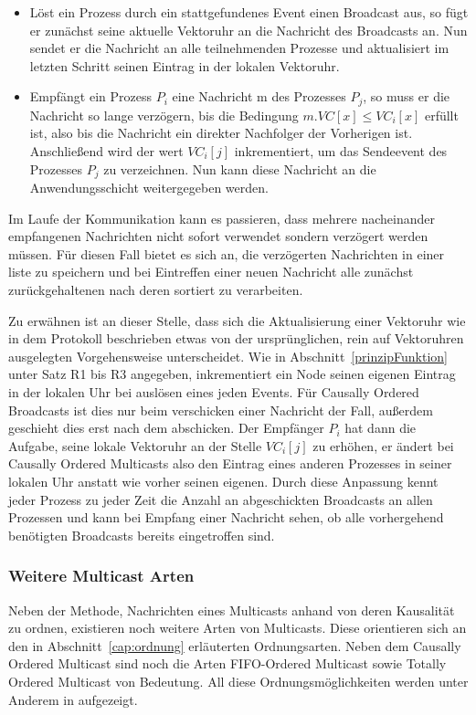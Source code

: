 \begin{itemize}
	\item Löst ein Prozess durch ein stattgefundenes Event einen Broadcast aus, so fügt er zunächst seine aktuelle Vektoruhr an die Nachricht des Broadcasts an. Nun sendet er die Nachricht an alle teilnehmenden Prozesse und aktualisiert im letzten Schritt seinen Eintrag in der lokalen Vektoruhr.
	\item Empfängt ein Prozess $P_i$ eine Nachricht m des Prozesses $P_j$, so muss er die Nachricht so lange verzögern, bis die Bedingung $m.VC[x] \le VC_i[x]$ erfüllt ist, also bis die Nachricht ein direkter Nachfolger der Vorherigen ist. Anschließend wird der wert $VC_i[j]$ inkrementiert, um das Sendeevent des Prozesses $P_j$ zu verzeichnen. Nun kann diese Nachricht an die Anwendungsschicht weitergegeben werden.
\end{itemize}

Im Laufe der Kommunikation kann es passieren, dass mehrere nacheinander empfangenen Nachrichten nicht sofort verwendet sondern verzögert werden müssen. Für diesen Fall bietet es sich an, die verzögerten Nachrichten in einer liste zu speichern und bei Eintreffen einer neuen Nachricht alle zunächst zurückgehaltenen nach deren  sortiert zu verarbeiten.

Zu erwähnen ist an dieser Stelle, dass sich die Aktualisierung einer Vektoruhr wie in dem Protokoll beschrieben etwas von der ursprünglichen, rein auf Vektoruhren ausgelegten Vorgehensweise unterscheidet. Wie in Abschnitt~\ref{prinzipFunktion} unter Satz R1 bis R3 angegeben, inkrementiert ein Node seinen eigenen Eintrag in der lokalen Uhr bei auslösen eines jeden Events. Für Causally Ordered Broadcasts ist dies nur beim verschicken einer Nachricht der Fall, außerdem geschieht dies erst nach dem abschicken. Der Empfänger $P_i$ hat dann die Aufgabe, seine lokale Vektoruhr an der Stelle $VC_i[j]$ zu erhöhen, er ändert bei Causally Ordered Multicasts also den Eintrag eines anderen Prozesses in seiner lokalen Uhr anstatt wie vorher seinen eigenen. Durch diese Anpassung kennt jeder Prozess zu jeder Zeit die Anzahl an abgeschickten Broadcasts an allen Prozessen und kann bei Empfang einer Nachricht sehen, ob alle vorhergehend benötigten Broadcasts bereits eingetroffen sind.
\subsubsection{Weitere Multicast Arten}
Neben der Methode, Nachrichten eines Multicasts anhand von deren Kausalität zu ordnen, existieren noch weitere Arten von Multicasts. Diese orientieren sich an den in Abschnitt~\ref{cap:ordnung} erläuterten Ordnungsarten. Neben dem Causally Ordered Multicast sind noch die Arten FIFO-Ordered Multicast sowie Totally Ordered Multicast von Bedeutung. All diese Ordnungsmöglichkeiten werden unter Anderem in \cite{Tanenbaum2007} aufgezeigt.

